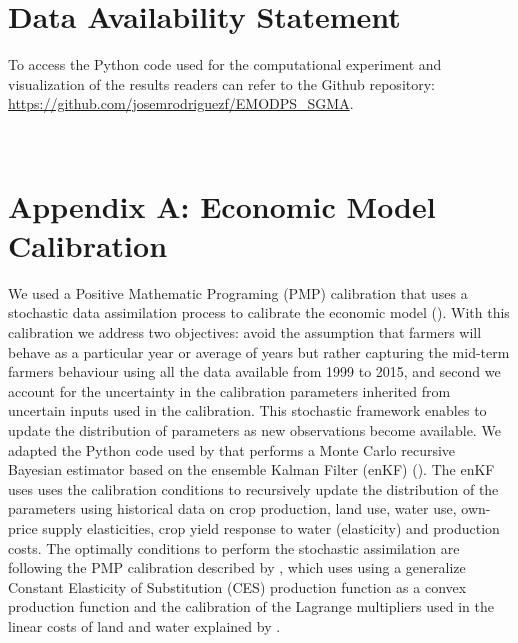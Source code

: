 \documentclass[11pt,a4paper]{article}
\begin{document}
\section*{Data Availability Statement}

To access the Python code used for the computational experiment and  visualization of the results readers can refer to the Github repository: \url{https://github.com/josemrodriguezf/EMODPS_SGMA}.

\newpage
\appendix
\renewcommand\thefigure{\thesection.\arabic{figure}} 
\setcounter{figure}{0}  
\renewcommand{\theequation}{\thesection.\arabic{equation}}\
\setcounter{equation}{0} 
\renewcommand{\thetable}{\thesection.\arabic{table}}\
\setcounter{table}{0} 

\section{Appendix A: Economic Model Calibration}

We used a Positive Mathematic Programing (PMP) calibration that uses a stochastic data assimilation process to calibrate the economic model (\cite{maneta_satellite-driven_2020}).  With this calibration we address two objectives: avoid the assumption that farmers will behave as a particular year or average of years but rather capturing the mid-term farmers behaviour using all the data available from 1999 to 2015, and second we account for the uncertainty in the calibration parameters inherited from uncertain inputs  used in the calibration. This stochastic framework enables to update the distribution of parameters as new observations become available. We adapted the Python code used by \textcite{maneta_satellite-driven_2020} that performs a Monte Carlo recursive Bayesian estimator based on the ensemble Kalman Filter (enKF) (\cite{evensen_sequential_1994}). The enKF uses uses the calibration conditions to recursively update the distribution of the parameters using historical data on crop production, land use, water use, own-price supply elasticities, crop yield response to water (elasticity) and production costs. The optimally conditions to perform the stochastic assimilation are following the PMP calibration described by \cite{merel_fully_2011}, which uses using a generalize Constant Elasticity of Substitution (CES) production function as a convex production function and the calibration of the Lagrange multipliers used in the linear costs of land and water explained by \textcite{garnache_calibration_2017}. 
\end{document}
